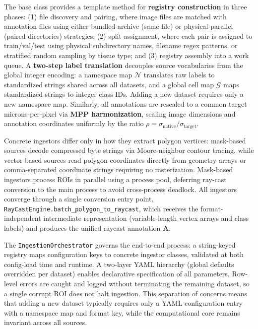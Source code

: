 The base class provides a template method for \textbf{registry construction} in three phases: (1) file discovery and pairing, where image files are matched with annotation files using either bundled-archive (same file) or physical-parallel (paired directories) strategies; (2) split assignment, where each pair is assigned to train/val/test using physical subdirectory names, filename regex patterns, or stratified random sampling by tissue type; and (3) registry assembly into a work queue. A \textbf{two-step label translation} decouples source vocabularies from the global integer encoding: a namespace map $\mathcal{N}$ translates raw labels to standardized strings shared across all datasets, and a global cell map $\mathcal{G}$ maps standardized strings to integer class IDs. Adding a new dataset requires only a new namespace map. Similarly, all annotations are rescaled to a common target microns-per-pixel via \textbf{MPP harmonization}, scaling image dimensions and annotation coordinates uniformly by the ratio $\rho = \sigma_{\text{native}} / \sigma_{\text{target}}$.

Concrete ingestors differ only in how they extract polygon vertices: mask-based sources decode compressed byte strings via Moore-neighbor contour tracing, while vector-based sources read polygon coordinates directly from geometry arrays or comma-separated coordinate strings requiring no rasterization. Mask-based ingestors process ROIs in parallel using a process pool, deferring ray-cast conversion to the main process to avoid cross-process deadlock. All ingestors converge through a single conversion entry point, \texttt{RayCastEngine.batch\_polygon\_to\_raycast}, which receives the format-independent intermediate representation (variable-length vertex arrays and class labels) and produces the unified raycast annotation $\mathbf{A}$.

The \texttt{IngestionOrchestrator} governs the end-to-end process: a string-keyed registry maps configuration keys to concrete ingestor classes, validated at both config-load time and runtime. A two-layer YAML hierarchy (global defaults overridden per dataset) enables declarative specification of all parameters. Row-level errors are caught and logged without terminating the remaining dataset, so a single corrupt ROI does not halt ingestion. This separation of concerns means that adding a new dataset typically requires only a YAML configuration entry with a namespace map and format key, while the computational core remains invariant across all sources.

